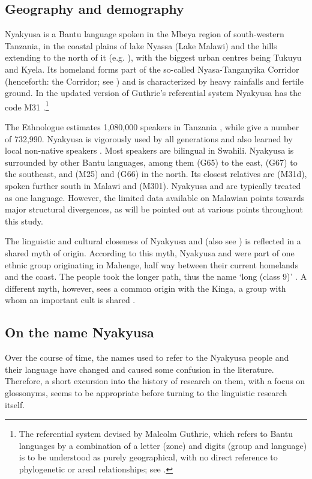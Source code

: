 \subsection{Geography and demography}
Nyakyusa is a Bantu language spoken in the Mbeya region of south-western Tanzania, in the coastal plains of lake Nyassa (Lake Malawi) and the hills extending to the north of it (e.g. \citealt[1]{WilsonM1963}), with the biggest urban centres being Tukuyu and Kyela. Its homeland forms part of the so-called Nyasa-Tanganyika Corridor (henceforth: the Corridor; see ) and is characterized by heavy rainfalls and fertile ground. In the updated version of Guthrie's referential system Nyakyusa has the code M31 \citep{MahoJ2009}.\footnote{The referential system devised by Malcolm Guthrie, which refers to Bantu languages by a combination of a letter (zone) and digits (group and language) is to be understood as purely geographical, with no direct reference to phylogenetic or areal relationships; see \citet{MahoJ2003}.}

The Ethnologue estimates 1,080,000 speakers in Tanzania \citep{SimonsGFeddingC2017}, while \citet{MuzaleRRugemaliraJ2008} give a number of 732,990. Nyakyusa is vigorously used by all generations and also learned by local non-native speakers \citep{LewisM2009}. Most speakers are bilingual in Swahili. Nyakyusa is surrounded by other Bantu languages, among them  (G65) to the east,  (G67) to the southeast, and  (M25) and  (G66) in the north. Its closest relatives are  (M31d), spoken further south in Malawi and  (M301). Nyakyusa and  are typically treated as one language. However, the limited data available on Malawian  points towards major structural divergences, as will be pointed out at various points throughout this study.

The linguistic and cultural closeness of Nyakyusa and  (also see ) is reflected in a shared myth of origin. According to this myth, Nyakyusa and  were part of one ethnic group originating in Mahenge, half way between their current homelands and the coast. The  people took the longer path, thus the name  `long (class 9)' \citep[39]{Konter-KataniM1989}. A different myth, however, sees a common origin with the Kinga, a group with whom an important cult is shared \citep[ch. 7]{WeberP1998}.

\subsection{On the name Nyakyusa}
Over the course of time, the names used to refer to the Nyakyusa people and their language have changed and caused some confusion in the literature. Therefore, a short excursion into the history of research on them, with a focus on glossonyms, seems to be appropriate before turning to the linguistic research itself.

